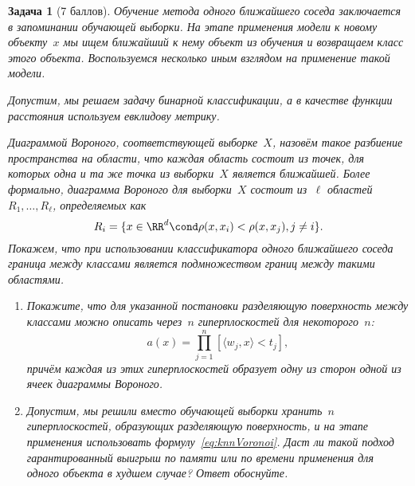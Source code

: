 \documentclass[12pt,fleqn]{article}
\newtheorem{esProblem}{Задача}
\begin{document}
\begin{esProblem}[7 баллов]
    Обучение метода одного ближайшего соседа заключается в запоминании обучающей выборки.
    На этапе применения модели к новому объекту~$x$ мы ищем ближайший к нему объект из обучения
    и возвращаем класс этого объекта.
    Воспользуемся несколько иным взглядом на применение такой модели.

    Допустим, мы решаем задачу бинарной классификации, а в качестве функции расстояния используем
    евклидову метрику.

    Диаграммой Вороного, соответствующей выборке~$X$, назовём такое разбиение пространства
    на области, что каждая область состоит из точек, для которых одна и та же точка из выборки~$X$ является ближайшей.
    Более формально, диаграмма Вороного для выборки~$X$ состоит из~$\ell$ областей~$R_1, \dots, R_\ell$,
    определяемых как
    \[
        R_i = \{x \in \RR^d \cond \rho(x, x_i) < \rho(x, x_j), j \neq i\}.
    \]
    Покажем, что при использовании классификатора одного ближайшего соседа
    граница между классами является подмножеством границ между такими областями.

    \begin{enumerate}
        \item Покажите, что для указанной постановки разделяющую поверхность между классами
            можно описать через~$n$ гиперплоскостей для некоторого~$n$:
            \begin{equation}
            \label{eq:knnVoronoi}
                a(x)
                =
                \prod_{j = 1}^{n}
                    [\langle w_j, x \rangle < t_j],
            \end{equation}
            причём каждая из этих гиперплоскостей образует одну из сторон
            одной из ячеек диаграммы Вороного.
        \item Допустим, мы решили вместо обучающей выборки хранить~$n$ гиперплоскостей, образующих разделяющую поверхность,
            и на этапе применения использовать формулу~\eqref{eq:knnVoronoi}.
            Даст ли такой подход гарантированный выигрыш по памяти или по времени применения для одного объекта
            в худшем случае?
            Ответ обоснуйте.
    \end{enumerate}
\end{esProblem}
\end{document}
